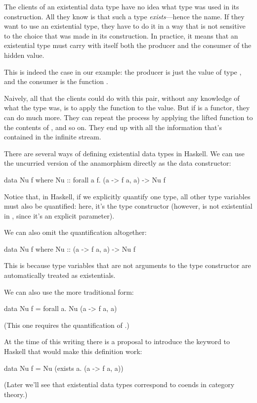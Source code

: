 \documentclass[DaoFP]{subfiles}
\begin{document}
The clients of an existential data type have no idea what type was used in its construction. All they know is that such a type \emph{exists}---hence the name. If they want to use an existential type, they have to do it in a way that is not sensitive to the choice that was made in its construction. In practice, it means that an existential type must carry with itself both the producer and the consumer of the hidden value. 

This is indeed the case in our example: the producer is just the value of type , and the consumer is the function .

Naively, all that the clients could do with this pair, without any knowledge of what the type  was, is to apply the function to the value. But if  is a functor, they can do much more. They can repeat the process by applying the lifted function to the contents of , and so on. They end up with all the information that's contained in the infinite stream.

There are several ways of defining existential data types in Haskell. We can use the uncurried version of the anamorphism directly as the data constructor:
\begin{haskell}
data Nu f where 
  Nu :: forall a f. (a -> f a, a) -> Nu f
\end{haskell}
Notice that, in Haskell, if we explicitly quantify one type, all other type variables must also be quantified: here, it's the type constructor  (however,  is not existential in , since it's an explicit parameter). 

We can also omit the quantification altogether:
\begin{haskell}
data Nu f where 
  Nu :: (a -> f a, a) -> Nu f
\end{haskell}
This is because type variables that are not arguments to the type constructor are automatically treated as existentials. 

We can also use the more traditional form:
\begin{haskell}
data Nu f = forall a. Nu (a -> f a, a)
\end{haskell}
(This one requires the quantification of .)

At the time of this writing there is a proposal to introduce the keyword  to Haskell that would make this definition work:
\begin{haskell}
data Nu f = Nu (exists a. (a -> f a, a))
\end{haskell}
(Later we'll see that existential data types correspond to coends in category theory.)
\end{document}
